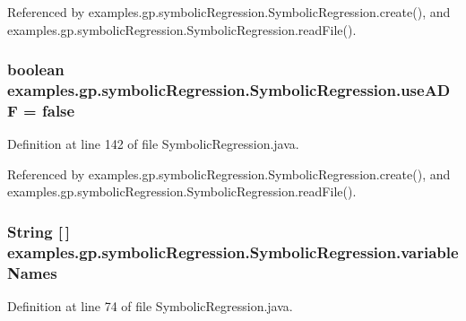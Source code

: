 Referenced by examples.\-gp.\-symbolic\-Regression.\-Symbolic\-Regression.\-create(), and examples.\-gp.\-symbolic\-Regression.\-Symbolic\-Regression.\-read\-File().

\hypertarget{classexamples_1_1gp_1_1symbolic_regression_1_1_symbolic_regression_a445e765c5dbed4c15269f00f5c891f01}{
\subsubsection[{use\-A\-D\-F}]{\setlength{\rightskip}{0pt plus 5cm}boolean examples.\-gp.\-symbolic\-Regression.\-Symbolic\-Regression.\-use\-A\-D\-F = false\hspace{0.3cm}{\ttfamily [static]}}}\label{classexamples_1_1gp_1_1symbolic_regression_1_1_symbolic_regression_a445e765c5dbed4c15269f00f5c891f01}


Definition at line 142 of file Symbolic\-Regression.\-java.



Referenced by examples.\-gp.\-symbolic\-Regression.\-Symbolic\-Regression.\-create(), and examples.\-gp.\-symbolic\-Regression.\-Symbolic\-Regression.\-read\-File().

\hypertarget{classexamples_1_1gp_1_1symbolic_regression_1_1_symbolic_regression_ac87f5f1e780bb2332e52011fe9d7539d}{
\subsubsection[{variable\-Names}]{\setlength{\rightskip}{0pt plus 5cm}String \mbox{[}$\,$\mbox{]} examples.\-gp.\-symbolic\-Regression.\-Symbolic\-Regression.\-variable\-Names\hspace{0.3cm}{\ttfamily [static]}}}\label{classexamples_1_1gp_1_1symbolic_regression_1_1_symbolic_regression_ac87f5f1e780bb2332e52011fe9d7539d}


Definition at line 74 of file Symbolic\-Regression.\-java.



